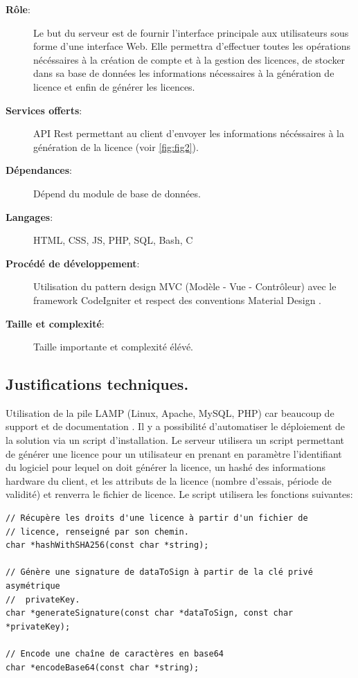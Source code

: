 \begin{description}
	\item[\textbf{Rôle}:]
	    Le but du serveur est de fournir l'interface principale aux utilisateurs sous forme d'une interface Web.
	    Elle permettra d'effectuer toutes les opérations nécéssaires à la création de compte et à la gestion des
	    licences, de stocker dans sa base de données les informations nécessaires à la génération de licence
        et enfin de générer les licences.
	\item[\textbf{Services offerts}:]
				API Rest \cite{REST} permettant au client d'envoyer les informations
				nécéssaires à la génération de la licence (voir \ref{fig:fig2}).			
	\item[\textbf{Dépendances}:]
				Dépend du module de base de données.
	\item[\textbf{Langages}:]
				HTML, CSS, JS, PHP, SQL, Bash, C 
	\item[\textbf{Procédé de développement}:]
				Utilisation du pattern design MVC (Modèle - Vue - Contrôleur) avec le framework
                CodeIgniter \cite{igniter} et respect des conventions Material Design
                \cite{Material}.
	\item[\textbf{Taille et complexité}:]
				Taille importante et complexité élévé.
\end{description}

\subsection{Justifications techniques.}
Utilisation de la pile LAMP (Linux, Apache, MySQL, PHP) car beaucoup de 
support et de documentation \cite{LAMP}. Il y a possibilité d'automatiser 
le déploiement de la solution via un script d'installation. \newline
Le serveur utilisera un script permettant de générer une licence pour un 
utilisateur en prenant en paramètre l'identifiant du logiciel pour lequel on doit 
générer la licence, un hashé des informations hardware du client, et les
attributs de la licence (nombre d'essais, période de validité) et renverra
le fichier de licence. Le script utilisera les fonctions suivantes:

\begin{verbatim}
// Récupère les droits d'une licence à partir d'un fichier de
// licence, renseigné par son chemin.
char *hashWithSHA256(const char *string);

// Génère une signature de dataToSign à partir de la clé privé asymétrique 
//  privateKey. 
char *generateSignature(const char *dataToSign, const char *privateKey);
  
// Encode une chaîne de caractères en base64
char *encodeBase64(const char *string);
\end{verbatim}

